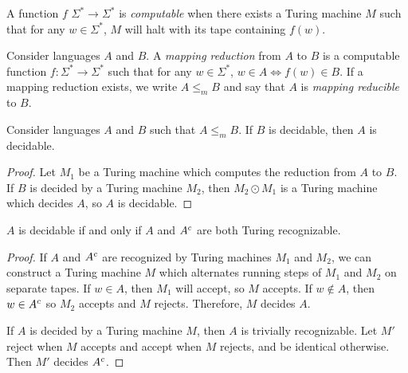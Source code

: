 \begin{defn}
    A function $f$ $\Sigma^{*} \to \Sigma^{*}$ is \emph{computable} when there exists a Turing machine $M$ such that for any $w \in \Sigma^{*}$, $M$ will halt with its tape containing $f(w)$.
\end{defn}

\begin{defn}
    Consider languages $A$ and $B$. A \emph{mapping reduction} from $A$ to $B$ is a computable function $f: \Sigma^{*} \to \Sigma^{*}$ such that for any $w \in \Sigma^{*}$, $w \in A \iff f(w) \in B$. If a mapping reduction exists, we write $A \leq_{m} B$ and say that $A$ is \emph{mapping reducible} to $B$.
\end{defn}

\begin{thm}\label{mapping-reduction-decidability}
    Consider languages $A$ and $B$ such that $A \leq_m B$. If $B$ is decidable, then $A$ is decidable.
\end{thm}

\begin{proof}
    Let $M_1$ be a Turing machine which computes the reduction from $A$ to $B$. If $B$ is decided by a Turing machine $M_2$, then $M_2 \odot M_1$ is a Turing machine which decides $A$, so $A$ is decidable.
\end{proof}

\begin{thm}
    $A$ is decidable if and only if $A$ and $A^{c}$ are both Turing recognizable.
\end{thm}

\begin{proof}
    If $A$ and $A^{c}$ are recognized by Turing machines $M_1$ and $M_2$, we can construct a Turing machine $M$ which alternates running steps of $M_1$ and $M_2$ on separate tapes. If $w \in A$, then $M_1$ will accept, so $M$ accepts. If $w \not\in A$, then $w \in A^{c}$ so $M_2$ accepts and $M$ rejects. Therefore, $M$ decides $A$.

    If $A$ is decided by a Turing machine $M$, then $A$ is trivially recognizable. Let $M'$ reject when $M$ accepts and accept when $M$ rejects, and be identical otherwise. Then $M'$ decides $A^{c}$.
\end{proof}

